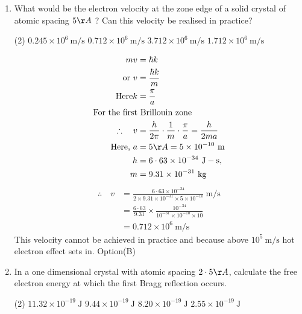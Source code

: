 \begin{enumerate}
\item What would be the electron velocity at the zone edge of a solid crystal of atomic spacing $5 \AA$ ? Can this velocity be realised in practice?
\begin{tasks}(2)
	\task[\textbf{a.}]$0 . 245 \times 10^{6} \mathrm{~m} / \mathrm{s}$  
	\task[\textbf{b.}]$0 . 712 \times 10^{6} \mathrm{~m} / \mathrm{s}$ 
	\task[\textbf{c.}] $3. 712 \times 10^{6} \mathrm{~m} / \mathrm{s}$ 
	\task[\textbf{d.}]$1 . 712 \times 10^{6} \mathrm{~m} / \mathrm{s}$  
\end{tasks}
\begin{answer}
$$
\begin{aligned}
m v&=\hbar k\\
\text{or }
v&=\frac{\hbar k}{m}\\
\text{Here}
k&=\frac{\pi}{a}\\
\text{For the first}&\text{ Brillouin zone}\\
\therefore \quad v&=\frac{h}{2 \pi} \cdot \frac{1}{m} \cdot \frac{\pi}{a}=\frac{h}{2 m a}\\
\text{Here, }
a &=5 \AA=5 \times 10^{-10} \mathrm{~m} \\
h &=6 \cdot 63 \times 10^{-34} \mathrm{~J}-\mathrm{s}, \\
m &=9.31 \times 10^{-31} \mathrm{~kg} 
\end{aligned}
$$
$$
\begin{aligned}
 \therefore \quad v&=\frac{6 \cdot 63 \times 10^{-34}}{2 \times 9.31 \times 10^{-31} \times 5 \times 10^{-10}} \mathrm{~m} / \mathrm{s} \\
& =\frac{6 \cdot 63}{9.31} \times \frac{10^{-34}}{10^{-31} \times 10^{-10} \times 10} \\
& =0 . 712 \times 10^{6} \mathrm{~m} / \mathrm{s}
\end{aligned}
$$
This velocity cannot be achieved in practice and because above $10^{5} \mathrm{~m} / \mathrm{s}$ hot electron effect sets in.
Option(B)
\end{answer}
\item In a one dimensional crystal with atomic spacing $2 \cdot 5 \AA$, calculate the free electron energy at which the first Bragg reflection occurs.
\begin{tasks}(2)
	\task[\textbf{a.}]  $11 . 32 \times 10^{-19} \mathrm{~J}$
	\task[\textbf{b.}]$9 . 44 \times 10^{-19} \mathrm{~J}$
	\task[\textbf{c.}] $8 .20\times 10^{-19} \mathrm{~J}$
	\task[\textbf{d.}] $2. 55 \times 10^{-19} \mathrm{~J}$
\end{tasks}
\begin{answer}

\end{answer}
\end{enumerate}

